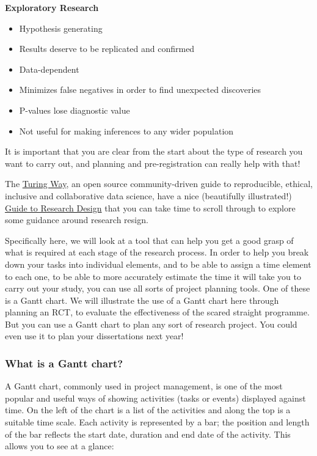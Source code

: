 \documentclass[
]{book}
\providecommand{\tightlist}{%
  \setlength{\itemsep}{0pt}\setlength{\parskip}{0pt}}
\begin{document}
\textbf{Exploratory Research}

\begin{itemize}
\tightlist
\item
  Hypothesis generating
\item
  Results deserve to be replicated and confirmed
\item
  Data-dependent
\item
  Minimizes false negatives in order to find unexpected discoveries
\item
  P-values lose diagnostic value
\item
  Not useful for making inferences to any wider population
\end{itemize}

It is important that you are clear from the start about the type of research you want to carry out, and planning and pre-registration can really help with that!

The \href{https://the-turing-way.netlify.app/welcome.html}{Turing Way}, an open source community-driven guide to reproducible, ethical, inclusive and collaborative data science, have a nice (beautifully illustrated!) \href{https://the-turing-way.netlify.app/project-design/project-design.html}{Guide to Research Design} that you can take time to scroll through to explore some guidance around research resign.

Specifically here, we will look at a tool that can help you get a good grasp of what is required at each stage of the research process. In order to help you break down your tasks into individual elements, and to be able to assign a time element to each one, to be able to more accurately estimate the time it will take you to carry out your study, you can use all sorts of project planning tools. One of these is a Gantt chart. We will illustrate the use of a Gantt chart here through planning an RCT, to evaluate the effectiveness of the scared straight programme. But you can use a Gantt chart to plan any sort of research project. You could even use it to plan your dissertations next year!

\hypertarget{what-is-a-gantt-chart}{%
\subsubsection{What is a Gantt chart?}\label{what-is-a-gantt-chart}}

A Gantt chart, commonly used in project management, is one of the most popular and useful ways of showing activities (tasks or events) displayed against time. On the left of the chart is a list of the activities and along the top is a suitable time scale. Each activity is represented by a bar; the position and length of the bar reflects the start date, duration and end date of the activity. This allows you to see at a glance:
\end{document}
